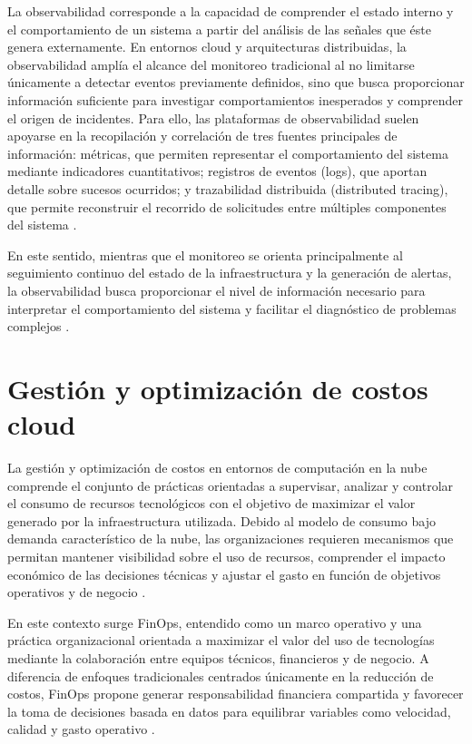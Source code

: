 La observabilidad corresponde a la capacidad de comprender el estado interno y el comportamiento de un sistema a partir del análisis de las señales que éste genera externamente. En entornos cloud y arquitecturas distribuidas, la observabilidad amplía el alcance del monitoreo tradicional al no limitarse únicamente a detectar eventos previamente definidos, sino que busca proporcionar información suficiente para investigar comportamientos inesperados y comprender el origen de incidentes. Para ello, las plataformas de observabilidad suelen apoyarse en la recopilación y correlación de tres fuentes principales de información: métricas, que permiten representar el comportamiento del sistema mediante indicadores cuantitativos; registros de eventos (logs), que aportan detalle sobre sucesos ocurridos; y trazabilidad distribuida (distributed tracing), que permite reconstruir el recorrido de solicitudes entre múltiples componentes del sistema \parencite{Kratzke2022}.

En este sentido, mientras que el monitoreo se orienta principalmente al seguimiento continuo del estado de la infraestructura y la generación de alertas, la observabilidad busca proporcionar el nivel de información necesario para interpretar el comportamiento del sistema y facilitar el diagnóstico de problemas complejos \parencite{Kratzke2022}.

\section{Gestión y optimización de costos cloud}

La gestión y optimización de costos en entornos de computación en la nube comprende el conjunto de prácticas orientadas a supervisar, analizar y controlar el consumo de recursos tecnológicos con el objetivo de maximizar el valor generado por la infraestructura utilizada. Debido al modelo de consumo bajo demanda característico de la nube, las organizaciones requieren mecanismos que permitan mantener visibilidad sobre el uso de recursos, comprender el impacto económico de las decisiones técnicas y ajustar el gasto en función de objetivos operativos y de negocio \parencite{FinOps2026}.

En este contexto surge FinOps, entendido como un marco operativo y una práctica organizacional orientada a maximizar el valor del uso de tecnologías mediante la colaboración entre equipos técnicos, financieros y de negocio. A diferencia de enfoques tradicionales centrados únicamente en la reducción de costos, FinOps propone generar responsabilidad financiera compartida y favorecer la toma de decisiones basada en datos para equilibrar variables como velocidad, calidad y gasto operativo \parencite{FinOps2026}.

